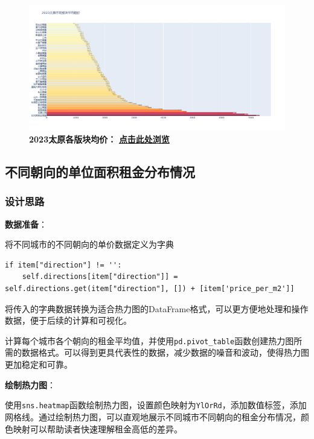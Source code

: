 \documentclass[lang=cn,11pt,a4paper]{elegantpaper}
\begin{document}
\begin{figure}[H]
    \centering
    \begin{minipage}{0.9\textwidth}
        \centering
        \includegraphics[width=\textwidth]{image/2023太原各板块.png}
        \textbf{2023太原各版块均价：} \href{https://yangchen-1318434888.cos.ap-beijing.myqcloud.com/images/2023%E5%A4%AA%E5%8E%9F%E4%B8%8D%E5%90%8C%E6%9D%BF%E5%9D%97%E5%B9%B3%E5%9D%87%E7%A7%9F%E4%BB%B7.html}{\textbf{点击此处浏览}}
    \end{minipage}
\end{figure}

\subsection{不同朝向的单位面积租金分布情况}

\subsubsection{设计思路}

\textbf{数据准备}：

将不同城市的不同朝向的单价数据定义为字典
\begin{lstlisting}
if item["direction"] != '':
    self.directions[item["direction"]] = self.directions.get(item["direction"], []) + [item['price_per_m2']]
\end{lstlisting}

将传入的字典数据转换为适合热力图的DataFrame格式，可以更方便地处理和操作数据，便于后续的计算和可视化。

计算每个城市各个朝向的租金平均值，并使用\lstinline{pd.pivot_table}函数创建热力图所需的数据格式。可以得到更具代表性的数据，减少数据的噪音和波动，使得热力图更加稳定和可靠。

\textbf{绘制热力图}：

使用\lstinline{sns.heatmap}函数绘制热力图，设置颜色映射为\lstinline{YlOrRd}，添加数值标签，添加网格线。通过绘制热力图，可以直观地展示不同城市不同朝向的租金分布情况，颜色映射可以帮助读者快速理解租金高低的差异。
\end{document}
